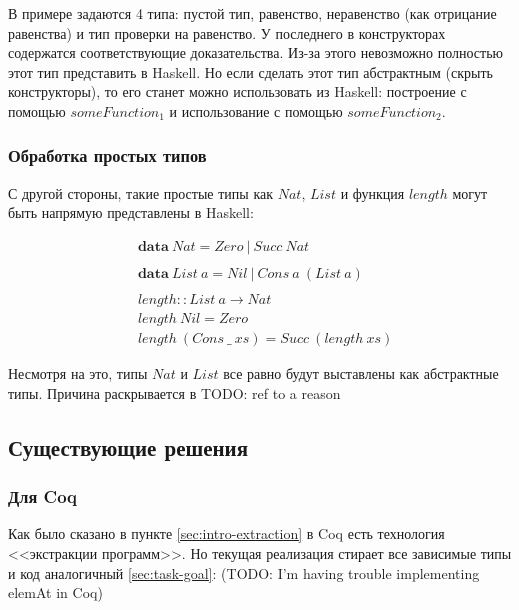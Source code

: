 В примере задаются 4 типа: пустой тип, равенство, неравенство
(как отрицание равенства) и тип проверки на равенство. У последнего
в конструкторах содержатся соответствующие доказательства. Из-за этого
невозможно полностью этот тип представить в Haskell. Но если сделать этот
тип абстрактным (скрыть конструкторы), то его станет можно использовать из
Haskell: построение с помощью \(someFunction_1\) и использование с помощью
\(someFunction_2\).

\subsubsection{Обработка простых типов}

С другой стороны, такие простые типы как \(Nat\), \(List\) и
функция \(length\) могут быть напрямую представлены в Haskell:

\begin{align*}
&\mathbf{data}\ Nat = Zero\ |\ Succ\ Nat\\
\\
&\mathbf{data}\ List\ a = Nil\ |\ Cons\ a\ (List\ a)\\
\\
&length :: List\ a \rightarrow Nat\\
&length\ Nil = Zero\\
&length\ (Cons\ \_\ xs) = Succ\ (length\ xs)
\end{align*}

Несмотря на это, типы \(Nat\) и \(List\) все равно будут выставлены
как абстрактные типы. Причина раскрывается в TODO: ref to a reason

\subsection{Существующие решения}

\subsubsection{Для Coq}

Как было сказано в пункте \ref{sec:intro-extraction} в Coq есть технология
<<экстракции программ>>. Но текущая реализация стирает все зависимые типы и
код аналогичный \ref{sec:task-goal}: (TODO: I'm having trouble implementing elemAt in Coq)

